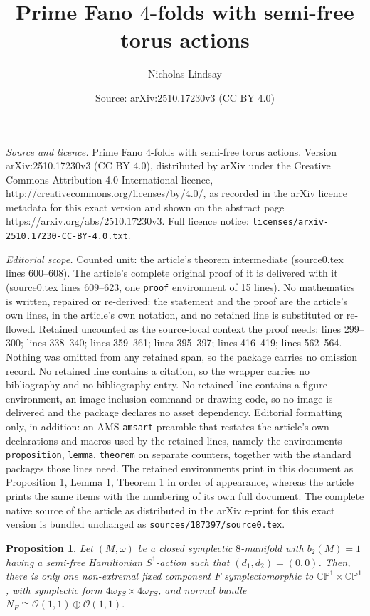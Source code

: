 \documentclass[10pt,a4paper]{amsart}
\title{Prime Fano $4$-folds with semi-free torus actions}
\author{Nicholas Lindsay}
\date{Source: arXiv:2510.17230v3 (CC BY 4.0)}
\newtheorem{proposition}{Proposition}
\begin{document}
\maketitle

\noindent\emph{Source and licence.} Prime Fano $4$-folds with semi-free torus actions. Version arXiv:2510.17230v3 (CC BY 4.0), distributed by arXiv under the Creative Commons Attribution 4.0 International licence, http://creativecommons.org/licenses/by/4.0/, as recorded in the arXiv licence metadata for this exact version and shown on the abstract page https://arxiv.org/abs/2510.17230v3. Full licence notice: \texttt{licenses/arxiv-2510.17230-CC-BY-4.0.txt}.\par\smallskip

\noindent\textit{Editorial scope.} Counted unit: the article's theorem intermediate (source0.tex lines 600--608). The article's complete original proof of it is delivered with it (source0.tex lines 609--623, one \texttt{proof} environment of 15 lines). No mathematics is written, repaired or re-derived: the statement and the proof are the article's own lines, in the article's own notation, and no retained line is substituted or re-flowed.  Retained uncounted as the source-local context the proof needs: lines 299--300; lines 338--340; lines 359--361; lines 395--397; lines 416--419; lines 562--564.  Nothing was omitted from any retained span, so the package carries no omission record.  No retained line contains a citation, so the wrapper carries no bibliography and no bibliography entry.  No retained line contains a figure environment, an image-inclusion command or drawing code, so no image is delivered and the package declares no asset dependency.  Editorial formatting only, in addition: an AMS \texttt{amsart} preamble that restates the article's own declarations and macros used by the retained lines, namely the environments \texttt{proposition}, \texttt{lemma}, \texttt{theorem} on separate counters, together with the standard packages those lines need.  The retained environments print in this document as Proposition 1, Lemma 1, Theorem 1 in order of appearance, whereas the article prints the same items with the numbering of its own full document.  The complete native source of the article as distributed in the arXiv e-print for this exact version is bundled unchanged as \texttt{sources/187397/source0.tex}.
\begin{proposition} \label{oneonecase} Let $(M,\omega)$ be a closed symplectic $8$-manifold with $b_{2}(M)=1$ having a semi-free Hamiltonian $S^1$-action such that $(d_1,d_2) = (0,0)$. Then, there is only one non-extremal fixed component $F$ symplectomorphic to $ \mathbb{CP}^1 \times \mathbb{CP}^1$, with symplectic form $4\omega_{FS} \times4\omega_{FS}$, and normal bundle $N_{F} \cong \mathcal{O}(1,1) \oplus \mathcal{O}(1,1).$
\end{proposition}
\end{document}
